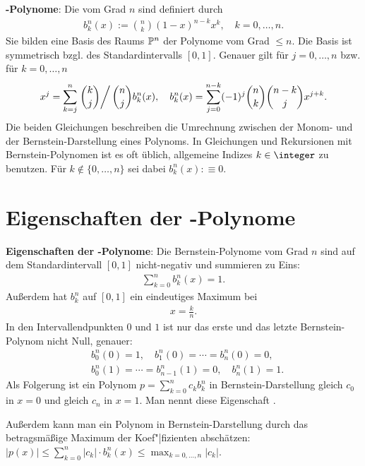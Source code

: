 \textbf{-Polynome}:
Die  vom Grad $n$ sind definiert durch
\begin{align*}
    b_k^n(x) := \binom{n}{k} (1 - x)^{n-k} x^k,\quad
    k = 0, \dotsc, n.
\end{align*}
Sie bilden eine Basis des Raums $\P^n$ der Polynome vom Grad $\le n$.
Die Basis ist symmetrisch bzgl. des Standardintervalls $[0, 1]$.
Genauer gilt für $j = 0, \dotsc, n$ bzw. für $k = 0, \dotsc, n$
\begin{align*}
    x^j = \sum_{k=j}^n \left.\binom{k}{j}\right/\binom{n}{j} b_k^n(x),\quad
    b_k^n(x) = \sum_{j=0}^{n-k} (-1)^j \binom{n}{k} \binom{n-k}{j} x^{j+k}.
\end{align*}
Die beiden Gleichungen beschreiben die Umrechnung zwischen der Monom- und der
Bernstein-Darstellung eines Polynoms.
In Gleichungen und Rekursionen mit Bernstein-Polynomen ist es oft üblich, allgemeine
Indizes $k \in \integer$ zu benutzen.
Für $k \notin \{0, \dotsc, n\}$ sei dabei $b_k^n(x) :\equiv 0$.

\section{%
    Eigenschaften der -Polynome%
}

\textbf{Eigenschaften der -Polynome}:
Die Bernstein-Polynome vom Grad $n$ sind auf dem Standardintervall $[0, 1]$ nicht-negativ und
summieren zu Eins:
\begin{align*}
    \sum_{k=0}^n b_k^n(x) = 1.
\end{align*}
Außerdem hat $b_k^n$ auf $[0, 1]$ ein eindeutiges Maximum bei
\begin{align*}
    x = \frac{k}{n}.
\end{align*}
In den Intervallendpunkten $0$ und $1$ ist nur das erste und das letzte Bernstein-Polynom
nicht Null, genauer:
\begin{align*}
    &b_0^n(0) = 1,\quad
    b_1^n(0) = \dotsb = b_n^n(0) = 0,\\
    &b_0^n(1) = \dotsb = b_{n-1}^n(1) = 0,\quad
    b_n^n(1) = 1.
\end{align*}
Als Folgerung ist ein Polynom $p = \sum_{k=0}^n c_k b_k^n$ in Bernstein-Darstellung
gleich $c_0$ in $x = 0$ und gleich $c_n$ in $x = 1$.
Man nennt diese Eigenschaft .

Außerdem kann man ein Polynom in Bernstein-Darstellung durch das betragsmäßige Maximum der
Koef"|fizienten abschätzen:
$|p(x)| \le \sum_{k=0}^n |c_k| \cdot b_k^n(x) \le \max_{k=0,\dotsc,n} |c_k|$.

